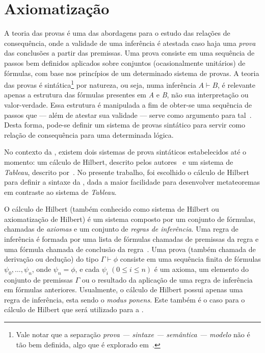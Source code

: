 \section{Axiomatização}\label{sec:axiomatizacao}

    A teoria das provas é uma das abordagens para o estudo das relações de consequência, onde a validade de uma inferência é atestada caso haja uma \textit{prova} das conclusões a partir das premissas. Uma prova consiste em uma sequência de passos bem definidos aplicados sobre conjuntos (ocasionalmente unitários) de fórmulas, com base nos princípios de um determinado sistema de provas. A teoria das provas é sintática\footnote{Vale notar que a separação \textit{prova {---} sintaxe {---} semântica {---} modelo} não é tão bem definida, algo que é explorado em~.} por natureza, ou seja, numa inferência $A \vdash B$, é relevante apenas a estrutura das fórmulas presentes em \textit{A} e \textit{B}, não sua interpretação ou valor-verdade. Essa estrutura é manipulada a fim de obter-se uma sequência de passos que {---} além de atestar sua validade {---} serve como argumento para tal~\cite{sep-logical-consequence}. Desta forma, pode-se definir um sistema de provas sintático para servir como relação de consequência para uma determinada lógica. 

    No contexto da \lfium{}, existem dois sistemas de prova sintáticos estabelecidos até o momento: um cálculo de Hilbert, descrito pelos autores~ e um sistema de \textit{Tableau}, descrito por~. No presente trabalho, foi escolhido o cálculo de Hilbert para definir a sintaxe da \lfium{}, dada a maior facilidade para desenvolver metateoremas em contraste ao sistema de \textit{Tableau}.

    O cálculo de Hilbert (também conhecido como sistema de Hilbert ou axiomatização de Hilbert) é um sistema composto por um conjunto de fórmulas, chamadas de \textit{axiomas} e um conjunto de \textit{regras de inferência}. Uma regra de inferência é formada por uma lista de fórmulas chamadas de premissas da regra e uma fórmula chamada de conclusão da regra~\cite{Restall1999-RESAIT-4}. Uma prova (também chamada de derivação ou dedução) do tipo $\Gamma \vdash \phi$ consiste em uma sequência finita de fórmulas \(\psi_0, \dots, \psi_n\), onde \(\psi_n = \phi\), e cada  $\psi_i\ (0 \leq i \leq n)$ é um axioma, um elemento do conjunto de premissas $\Gamma$ ou o resultado da aplicação de uma regra de inferência em fórmulas anteriores. Usualmente, o cálculo de Hilbert possui apenas uma regra de inferência, esta sendo o \textit{modus ponens}. Este também é o caso para o cálculo de Hilbert que será utilizado para a \lfium{}.
    
